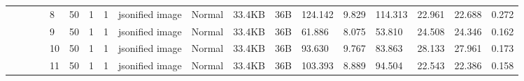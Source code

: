 \begin{landscape}
\begin{table}[]
{\begin{tabular}{@{}ccccllllllllllllll@{}}
                                                                                   &                              &                                &                                                                                                          & 8                                                     & 50                                       & 1                                          & 1                                 & jsonified image                  & Normal                             & 33.4KB                                        & 36B                                             & 124.142                 & 9.829    & 114.313                      & 22.961                  & 22.688   & 0.272                        \\
                                                                                   &                              &                                &                                                                                                          & 9                                                     & 50                                       & 1                                          & 1                                 & jsonified image                  & Normal                             & 33.4KB                                        & 36B                                             & 61.886                  & 8.075    & 53.810                       & 24.508                  & 24.346   & 0.162                        \\
                                                                                   &                              &                                &                                                                                                          & 10                                                    & 50                                       & 1                                          & 1                                 & jsonified image                  & Normal                             & 33.4KB                                        & 36B                                             & 93.630                  & 9.767    & 83.863                       & 28.133                  & 27.961   & 0.173                        \\
                                                                                   &                              &                                &                                                                                                          & 11                                                    & 50                                       & 1                                          & 1                                 & jsonified image                  & Normal                             & 33.4KB                                        & 36B                                             & 103.393                 & 8.889    & 94.504                       & 22.543                  & 22.386   & 0.158                        \\

\end{tabular}}
\end{table}
\end{landscape}
